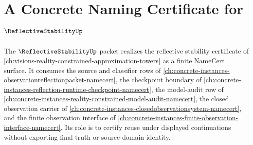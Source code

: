 \chapter{A Concrete Naming Certificate for $\ReflectiveStabilityUp$}
\label{ch:concrete-instances-reflective-stability-namecert}

The $\ReflectiveStabilityUp$ packet realizes the reflective stability certificate of \autoref{ch:visions-reality-constrained-approximation-towers} as a finite NameCert surface. It consumes the source and classifier rows of \autoref{ch:concrete-instances-observationreflectionpacket-namecert}, the checkpoint boundary of \autoref{ch:concrete-instances-reflection-runtime-checkpoint-namecert}, the model-audit row of \autoref{ch:concrete-instances-reality-constrained-model-audit-namecert}, the closed observation carrier of \autoref{ch:concrete-instances-closedobservationsystem-namecert}, and the finite observation interface of \autoref{ch:concrete-instances-finite-observation-interface-namecert}. Its role is to certify reuse under displayed continuations without exporting final truth or source-domain identity.

